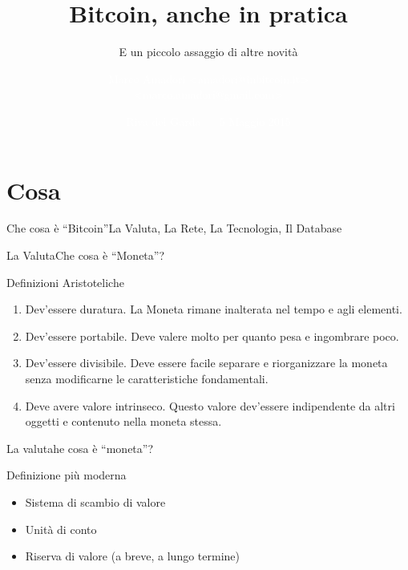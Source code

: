 \documentclass[english,compress]{beamer}
\title[Introduzione al Bitcoin]{Bitcoin, anche in pratica}
\subtitle{E un piccolo assaggio di altre novità}
\author[Marco Amadori]{\textcolor{white}{Marco Amadori <amadori@inbitcoin.it> \\ <marco.amadori@gmail.com>}}
\institute{\textcolor{white}{\textbf{\begin{large}InBitcoin.it                                                 \end{large}}}}
\date{\textcolor{white}{\scriptsize Riva del Garda --- \vspace{.10cm}5 Maggio 2015}}
\begin{document}

\begin{frame}[plain]
  \titlepage
  \begin{center}%
         \hspace{1cm}%

    \end{center}%
\end{frame}


\section{Cosa}

\usebackgroundtemplate{}

\begin{frame}{Che cosa è ``Bitcoin''}{La Valuta, La Rete, La Tecnologia, Il Database}
\begin{center}
\end{center}
\end{frame}

\begin{frame}{La Valuta}{Che cosa è ``Moneta''?}
\begin{exampleblock}{Definizioni Aristoteliche}
\begin{enumerate}
 \item Dev'essere duratura. La Moneta rimane inalterata nel tempo e agli elementi.
 \item Dev'essere portabile. Deve valere molto per quanto pesa e ingombrare poco.
 \item Dev'essere divisibile. Deve essere facile separare e riorganizzare la moneta
  senza modificarne le caratteristiche fondamentali.
 
 \item Deve avere valore intrinseco. Questo valore dev'essere indipendente da altri oggetti e contenuto nella moneta stessa.
 \end{enumerate}
\end{exampleblock}
\end{frame}

\begin{frame}{La valuta}{he cosa è ``moneta''?}

\begin{exampleblock}{Definizione più moderna}
\begin{itemize}
 \item Sistema di scambio di valore
 \item Unità di conto
 \item Riserva di valore (a breve, a lungo termine)
\end{itemize}
\end{exampleblock}
\end{frame}
\end{document}
